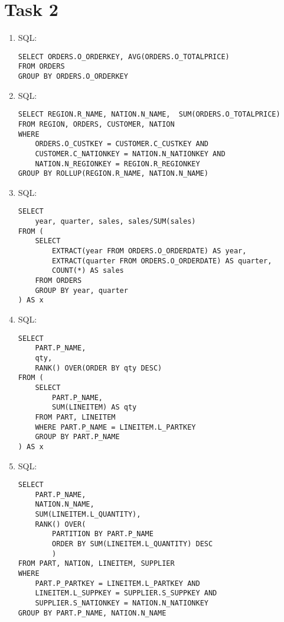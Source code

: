 \documentclass{article}
\begin{document}
	\section*{Task 2}
	\begin{enumerate}[label=(\alph*)]
		\item SQL:
		\begin{lstlisting}[tabsize=2]
SELECT ORDERS.O_ORDERKEY, AVG(ORDERS.O_TOTALPRICE)
FROM ORDERS
GROUP BY ORDERS.O_ORDERKEY
		\end{lstlisting}
		\item SQL:
		\begin{lstlisting}[tabsize=2]
SELECT REGION.R_NAME, NATION.N_NAME,  SUM(ORDERS.O_TOTALPRICE)
FROM REGION, ORDERS, CUSTOMER, NATION
WHERE 
	ORDERS.O_CUSTKEY = CUSTOMER.C_CUSTKEY AND 
	CUSTOMER.C_NATIONKEY = NATION.N_NATIONKEY AND 
	NATION.N_REGIONKEY = REGION.R_REGIONKEY 
GROUP BY ROLLUP(REGION.R_NAME, NATION.N_NAME)
		\end{lstlisting}
		\item SQL:
		\begin{lstlisting}[tabsize=2]
SELECT
	year, quarter, sales, sales/SUM(sales)
FROM (
	SELECT 
		EXTRACT(year FROM ORDERS.O_ORDERDATE) AS year, 
		EXTRACT(quarter FROM ORDERS.O_ORDERDATE) AS quarter,
		COUNT(*) AS sales
	FROM ORDERS
	GROUP BY year, quarter
) AS x
		\end{lstlisting}
		\item SQL:
		\begin{lstlisting}[tabsize=2]
SELECT
	PART.P_NAME, 
	qty, 
	RANK() OVER(ORDER BY qty DESC)
FROM (
	SELECT 
		PART.P_NAME,
		SUM(LINEITEM) AS qty
	FROM PART, LINEITEM
	WHERE PART.P_NAME = LINEITEM.L_PARTKEY
	GROUP BY PART.P_NAME
) AS x
		\end{lstlisting}
		\item SQL:
		\begin{lstlisting}[tabsize=2]
SELECT
	PART.P_NAME,
	NATION.N_NAME,
	SUM(LINEITEM.L_QUANTITY),
	RANK() OVER(
		PARTITION BY PART.P_NAME 
		ORDER BY SUM(LINEITEM.L_QUANTITY) DESC
		)
FROM PART, NATION, LINEITEM, SUPPLIER
WHERE
	PART.P_PARTKEY = LINEITEM.L_PARTKEY AND
	LINEITEM.L_SUPPKEY = SUPPLIER.S_SUPPKEY AND
	SUPPLIER.S_NATIONKEY = NATION.N_NATIONKEY
GROUP BY PART.P_NAME, NATION.N_NAME
		\end{lstlisting}
	\end{enumerate}
\end{document}
